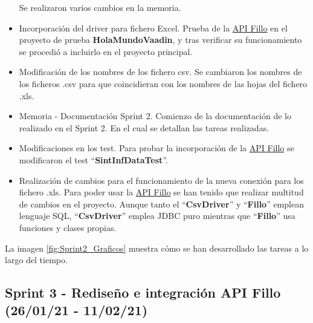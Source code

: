 \begin{itemize}
		Se realizaron varios cambios en la memoria.
	\item Incorporación del driver para fichero Excel. 
		Prueba de la \href{https://codoid.com/fillo/}{API Fillo} en el proyecto de prueba \textbf{HolaMundoVaadin}, y tras verificar su funcionamiento se procedió a incluirlo en el proyecto principal.
	\item Modificación de los nombres de los fichero csv. 
		Se cambiaron los nombres de los ficheros .csv para que coincidieran con los nombres de las hojas del fichero .xls. 
	\item Memoria - Documentación Sprint 2. 
		Comienzo de la documentación de lo realizado en el Sprint 2. En el cual se detallan las tareas realizadas.
	\item Modificaciones en los test. 
		Para probar la incorporación de la \href{https://codoid.com/fillo/}{API Fillo} se modificaron el test  ``\textbf{\textbf{SintInfDataTest}}''.
	\item Realización de cambios para el funcionamiento de la nueva conexión para los fichero .xls. 
		Para poder usar la \href{https://codoid.com/fillo/}{API Fillo} se han tenido que realizar multitud de cambios en el proyecto. Aunque tanto el ``\textbf{\textbf{CsvDriver}}'' y ``\textbf{\textbf{Fillo}}'' emplean lenguaje SQL, ``\textbf{CsvDriver}'' emplea JDBC puro mientras que ``\textbf{Fillo}'' usa funciones y clases propias.
\end{itemize}

La imagen \ref{fig:Sprint2_Graficos} muestra cómo se han desarrollado las tareas a lo largo del tiempo.


\subsection{Sprint 3 - Rediseño e integración API Fillo (26/01/21 - 11/02/21)}

